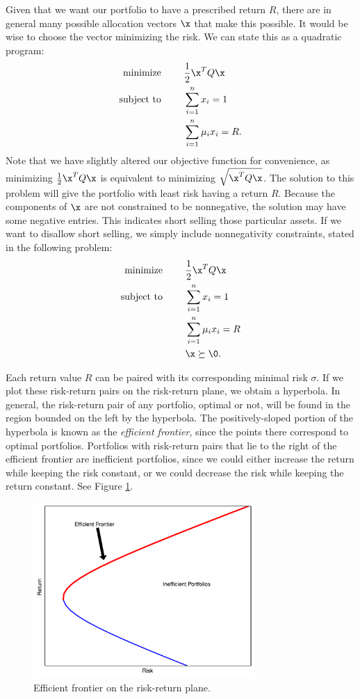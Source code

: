 Given that we want our portfolio to have a prescribed return $R$, there are in general many possible allocation vectors $\x$ that make this possible.
It would be wise to choose the vector minimizing the risk.
We can state this as a quadratic program:
\begin{align*}
\text{minimize }\qquad &\frac{1}{2}\x^TQ\x\\
\text{subject to }\qquad &\sum_{i=1}^n x_i = 1\\
&\sum_{i=1}^n \mu_ix_i = R.\\
\end{align*}
Note that we have slightly altered our objective function for convenience, as minimizing $\frac{1}{2}\x^TQ\x$ is equivalent to minimizing $\sqrt{\x^TQ\x}$.
The solution to this problem will give the portfolio with least risk having a return $R$.
Because the components of $\x$ are not constrained to be nonnegative, the solution may have some negative entries.
This indicates short selling those particular assets.
If we want to disallow short selling, we simply include nonnegativity constraints, stated in the following problem:
\begin{align*}
\text{minimize }\qquad &\frac{1}{2}\x^TQ\x\\
\text{subject to }\qquad &\sum_{i=1}^n x_i = 1\\
&\sum_{i=1}^n \mu_ix_i = R\\
&\x \succeq \0.
\end{align*}

Each return value $R$ can be paired with its corresponding minimal risk $\sigma$.
If we plot these risk-return pairs on the risk-return plane, we obtain a hyperbola.
In general, the risk-return pair of any portfolio, optimal or not, will be found in the region bounded on the left by the hyperbola.
The positively-sloped portion of the hyperbola is known as the
\emph{efficient frontier}, since the points there correspond to optimal portfolios.
Portfolios with risk-return pairs that lie to the right of the efficient frontier are inefficient portfolios, since we could either increase the return while keeping the risk constant, or we could decrease the risk while keeping the return constant.
See Figure \ref{fig:frontier}.

\begin{figure}[H]
\includegraphics[width=0.75\textwidth]{frontier.pdf}
\caption{Efficient frontier on the risk-return plane.}
\label{fig:frontier}
\end{figure}

